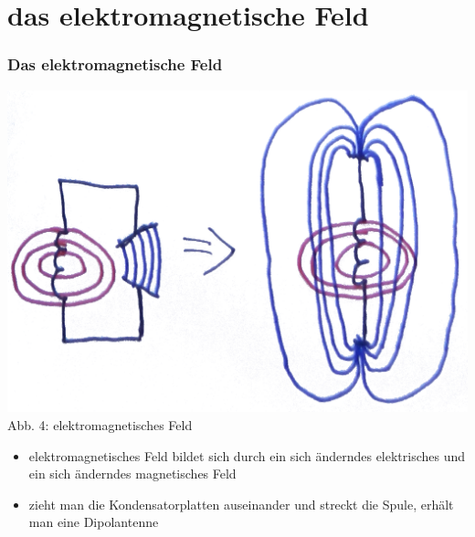\section*{das elektromagnetische Feld}
\begin{frame}
\frametitle{Das elektromagnetische Feld}
\begin{center}
	\includegraphics[scale=0.6]{e08/emagfeld1.png}\\
	Abb. 4: elektromagnetisches Feld
	\begin{itemize}
		\item elektromagnetisches Feld bildet sich durch ein sich \"anderndes elektrisches und ein sich \"anderndes magnetisches Feld
		\item zieht man die Kondensatorplatten auseinander und streckt die Spule, erhält man eine Dipolantenne 
	\end{itemize}
\end{center}
\end{frame}

